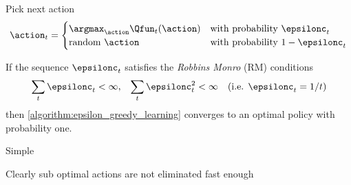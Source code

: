 \begin{algorithmbox}\nospacing
  \begin{algo}\label{algorithm:epsilon_greedy_learning}\leavevmode
    \begin{algorithmic}[1]
        \State Pick next action
        \begin{align*}
          \action_{t}=
            \begin{cases}
              \argmax_{\action}\Qfun_{t}(\action)&\text{with probability }\epsilonc_{t}\\
              \text{random }\action&\text{with probability }1-\epsilonc_{t}\\
            \end{cases}
        \end{align*}
    \EndFor
    \end{algorithmic}
  \end{algo}
\end{algorithmbox}
\begin{corbox}\nospacing
  \begin{cor}\label{cor:epsilon_greedy_necessary_condition_for_convergence}
    If the sequence $\epsilonc_{t}$ satisfies the \textit{Robbins Monro} (RM) conditions
    \begin{align}
      \sum_{t}\epsilonc_{t}<\infty,&&\sum_{t}\epsilonc_{t}^{2}<\infty&&(\text{i.e. } \epsilonc_{t}=1/t)
    \end{align}
    then \cref{algorithm:epsilon_greedy_learning} converges to an optimal policy with probability one.
  \end{cor}
\end{corbox}
\begin{sectionbox}\nospacing
  \begin{minipage}[t]{0.2\textwidth}
    \begin{proslist}
    \item Simple
    \end{proslist}
  \end{minipage}
  \begin{minipage}[t]{0.7\textwidth}
    \begin{conslist}
    \item Clearly sub optimal actions are not eliminated fast enough
    \end{conslist}
  \end{minipage}
\end{sectionbox}
